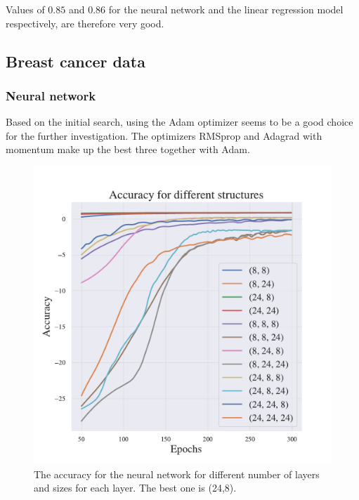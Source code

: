 Values of $0.85$ and $0.86$ for the neural network and the linear regression model respectively, are therefore very good. 


\subsection{Breast cancer data}

\subsubsection{Neural network}

Based on the initial search, using the Adam optimizer seems to be a good choice for the further investigation. The optimizers RMSprop and Adagrad with momentum make up the best three together with Adam. 

\begin{figure}[h!]
    \centering
    \includegraphics[width=1.0\linewidth]{project_2/figures/Accuracy for different structures_classification.pdf}
    \caption{The accuracy for the neural network for different number of layers and sizes for each layer. The best one is (24,8).}
    \label{fig:structure_cancer}
\end{figure}

